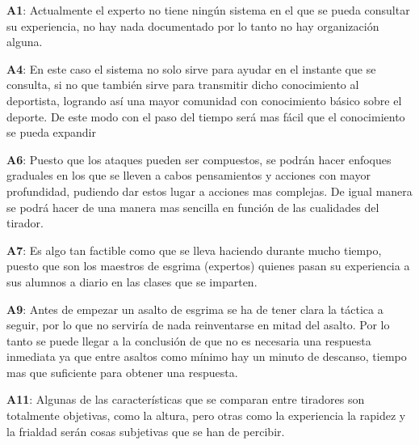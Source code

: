 \begin{compactitem}
  \item[\textbf{A1}:] Actualmente el experto no tiene ningún sistema en el que
     se pueda consultar su experiencia, no hay nada documentado por lo tanto no
     hay organización alguna.
  \item[\textbf{A4}:] En este caso el sistema no solo sirve para ayudar en el
     instante que se consulta, si no que también sirve para transmitir dicho
     conocimiento al deportista, logrando así una mayor comunidad con
     conocimiento básico sobre el deporte. De este modo con el paso del tiempo
     será mas fácil que el conocimiento se pueda expandir
  \item[\textbf{A6}:] Puesto que los ataques pueden ser compuestos, se podrán
     hacer enfoques graduales en los que se lleven a cabos pensamientos y
     acciones con mayor profundidad, pudiendo dar estos lugar a acciones mas
     complejas. De igual manera se podrá hacer de una manera mas sencilla
     en función de las cualidades del tirador.
  \item[\textbf{A7}:] Es algo tan factible como que se lleva haciendo durante
     mucho tiempo, puesto que son los maestros de esgrima (expertos) quienes
     pasan su experiencia a sus alumnos a diario en las clases que se imparten.
  \item[\textbf{A9}:] Antes de empezar un asalto de esgrima se ha de tener
     clara la táctica a seguir, por lo que no serviría de nada reinventarse
     en mitad del asalto. Por lo tanto se puede llegar a la conclusión de que
     no es necesaria una respuesta inmediata ya que entre asaltos como mínimo
     hay un minuto de descanso, tiempo mas que suficiente para obtener una respuesta.
  \item[\textbf{A11}:] Algunas de las características que se comparan entre
     tiradores son totalmente objetivas, como la altura, pero otras como la experiencia
     la rapidez y la frialdad serán cosas subjetivas que se han de percibir.
\end{compactitem}
\newpage

